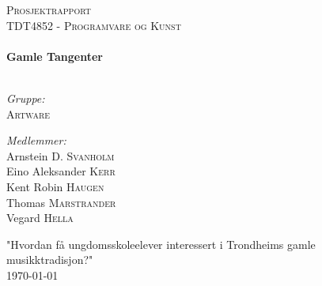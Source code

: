 \begin{titlepage}
\begin{center}

\textsc{\LARGE Prosjektrapport}\\[1.5cm]
\textsc{\Large TDT4852 - Programvare og Kunst}\\[0.5cm]

\HRule \\[0.7cm]
{ \huge \bfseries Gamle Tangenter}\\[0.4cm]
\HRule \\[1.5cm]

\begin{minipage}{0.4\textwidth}
\begin{flushleft} \large
\emph{Gruppe:}\\
\textsc{Artware}
\end{flushleft}
\end{minipage}
\begin{minipage}{0.4\textwidth}
\begin{flushright} \large
\emph{Medlemmer:} \\
Arnstein D. \textsc{Svanholm} \\
Eino Aleksander \textsc{Kerr} \\
Kent Robin \textsc{Haugen} \\
Thomas \textsc{Marstrander} \\
Vegard \textsc{Hella} \\
\end{flushright}
\end{minipage}

\vfill

\Large "Hvordan få ungdomsskoleelever interessert i Trondheims gamle musikktradisjon?"\\[3.5cm]

{\large \today}


\end{center}
\end{titlepage}
